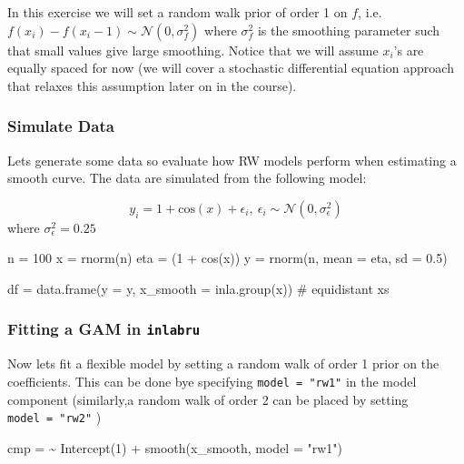 \documentclass[
  letterpaper,
  DIV=11,
  numbers=noendperiod]{scrartcl}
\newenvironment{Shaded}{\begin{snugshade}}{\end{snugshade}}
\newcommand{\AttributeTok}[1]{\textcolor[rgb]{0.40,0.45,0.13}{#1}}
\newcommand{\CommentTok}[1]{\textcolor[rgb]{0.37,0.37,0.37}{#1}}
\newcommand{\DecValTok}[1]{\textcolor[rgb]{0.68,0.00,0.00}{#1}}
\newcommand{\ErrorTok}[1]{\textcolor[rgb]{0.68,0.00,0.00}{#1}}
\newcommand{\FloatTok}[1]{\textcolor[rgb]{0.68,0.00,0.00}{#1}}
\newcommand{\FunctionTok}[1]{\textcolor[rgb]{0.28,0.35,0.67}{#1}}
\newcommand{\NormalTok}[1]{\textcolor[rgb]{0.00,0.23,0.31}{#1}}
\newcommand{\OtherTok}[1]{\textcolor[rgb]{0.00,0.23,0.31}{#1}}
\newcommand{\SpecialCharTok}[1]{\textcolor[rgb]{0.37,0.37,0.37}{#1}}
\newcommand{\StringTok}[1]{\textcolor[rgb]{0.13,0.47,0.30}{#1}}
\begin{document}
In this exercise we will set a random walk prior of order 1 on \(f\),
i.e.~\(f(x_i)-f(x_i-1) \sim \mathcal{N}(0,\sigma^2_f)\) where
\(\sigma_f^2\) is the smoothing parameter such that small values give
large smoothing. Notice that we will assume \(x_i\)'s are equally spaced
for now (we will cover a stochastic differential equation approach that
relaxes this assumption later on in the course).

\subsubsection{Simulate Data}\label{simulate-data}

Lets generate some data so evaluate how RW models perform when
estimating a smooth curve. The data are simulated from the following
model:

\[
y_i = 1 + \mathrm{cos}(x) + \epsilon_i, ~ \epsilon_i \sim \mathcal{N}(0,\sigma^2_\epsilon)
\] where \(\sigma_\epsilon^2 = 0.25\)

\begin{Shaded}
\begin{Highlighting}[]
\NormalTok{n }\OtherTok{=} \DecValTok{100}
\NormalTok{x }\OtherTok{=} \FunctionTok{rnorm}\NormalTok{(n)}
\NormalTok{eta }\OtherTok{=}\NormalTok{ (}\DecValTok{1} \SpecialCharTok{+} \FunctionTok{cos}\NormalTok{(x))}
\NormalTok{y }\OtherTok{=} \FunctionTok{rnorm}\NormalTok{(n, }\AttributeTok{mean =}\NormalTok{  eta, }\AttributeTok{sd =} \FloatTok{0.5}\NormalTok{)}

\NormalTok{df }\OtherTok{=} \FunctionTok{data.frame}\NormalTok{(}\AttributeTok{y =}\NormalTok{ y, }
                \AttributeTok{x\_smooth =} \FunctionTok{inla.group}\NormalTok{(x)) }\CommentTok{\# equidistant x\textquotesingle{}s }
\end{Highlighting}
\end{Shaded}

\subsubsection{\texorpdfstring{Fitting a GAM in
\texttt{inlabru}}{Fitting a GAM in inlabru}}\label{fitting-a-gam-in-inlabru}

Now lets fit a flexible model by setting a random walk of order 1 prior
on the coefficients. This can be done bye specifying
\texttt{model\ =\ "rw1"} in the model component (similarly,a random walk
of order 2 can be placed by setting \texttt{model\ =\ "rw2"} )

\begin{Shaded}
\begin{Highlighting}[]
\NormalTok{cmp }\OtherTok{=}  \ErrorTok{\textasciitilde{}} \FunctionTok{Intercept}\NormalTok{(}\DecValTok{1}\NormalTok{) }\SpecialCharTok{+} 
  \FunctionTok{smooth}\NormalTok{(x\_smooth, }\AttributeTok{model =} \StringTok{"rw1"}\NormalTok{)}
\end{Highlighting}
\end{Shaded}
\end{document}
